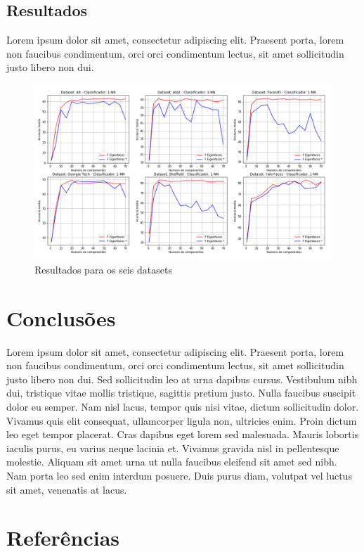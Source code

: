 \documentclass[12pt]{article}
\begin{document}
\subsection{Resultados}

Lorem ipsum dolor sit amet, consectetur adipiscing elit. Praesent porta, lorem non faucibus condimentum, orci orci condimentum lectus, sit amet sollicitudin justo libero non dui. 


\begin{figure}[!h] \centering 
\includegraphics[scale=0.5]{resultados.png} 
\caption{Resultados para os seis datasets} 
\label{fig:Res} \end{figure} 

\section{Conclusões}

Lorem ipsum dolor sit amet, consectetur adipiscing elit. Praesent porta, lorem non faucibus condimentum, orci orci condimentum lectus, sit amet sollicitudin justo libero non dui. Sed sollicitudin leo at urna dapibus cursus. Vestibulum nibh dui, tristique vitae mollis tristique, sagittis pretium justo. Nulla faucibus suscipit dolor eu semper. Nam nisl lacus, tempor quis nisi vitae, dictum sollicitudin dolor. Vivamus quis elit consequat, ullamcorper ligula non, ultricies enim. Proin dictum leo eget tempor placerat. Cras dapibus eget lorem sed malesuada. Mauris lobortis iaculis purus, eu varius neque lacinia et. Vivamus gravida nisl in pellentesque molestie. Aliquam sit amet urna ut nulla faucibus eleifend sit amet sed nibh. Nam porta leo sed enim interdum posuere. Duis purus diam, volutpat vel luctus sit amet, venenatis at lacus. 

\section{Referências}
\end{document}
